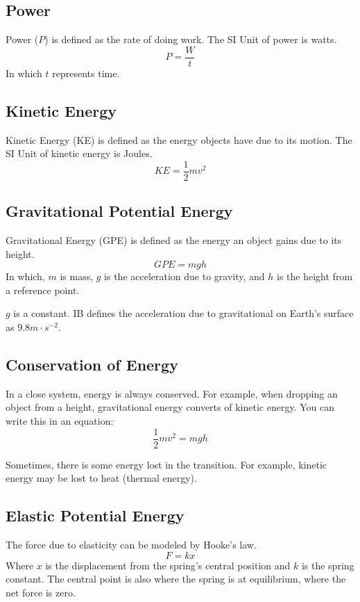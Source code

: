 \documentclass[../notes.tex]{subfiles}
\begin{document}
\subsection{Power}
Power ($P$) is defined as the rate of doing work.
The SI Unit of power is watts.
\begin{equation}
	P = \frac{W}{t}
\end{equation}
In which $t$ represents time.

\subsection{Kinetic Energy}
Kinetic Energy (KE) is defined as the energy objects have due to its motion.
The SI Unit of kinetic energy is Joules.
\begin{equation}
	KE = \frac{1}{2}mv^2
\end{equation}

\subsection{Gravitational Potential Energy}
Gravitational Energy (GPE) is defined as the energy an object gains due to its height.
\begin{equation}
	GPE = mgh
\end{equation}
In which, $m$ is mass, $g$ is the acceleration due to gravity, and $h$ is the height from a reference point. 

$g$ is a constant.
IB defines the acceleration due to gravitational on Earth's surface as $9.8 m\cdot s^{-2}$.

\subsection{Conservation of Energy}
In a close system, energy is always conserved.
For example, when dropping an object from a height, gravitational energy converts of kinetic energy.
You can write this in an equation:
\begin{equation}
	\frac{1}{2}mv^2 = mgh 
\end{equation}

Sometimes, there is some energy lost in the transition.
For example, kinetic energy may be lost to heat (thermal energy).

\subsection{Elastic Potential Energy}
The force due to elasticity can be modeled by Hooke's law.
\begin{equation}
	F = kx
\end{equation}
Where $x$ is the displacement from the spring's central position and $k$ is the spring constant.
The central point is also where the spring is at equilibrium, where the net force is zero.
\end{document}
